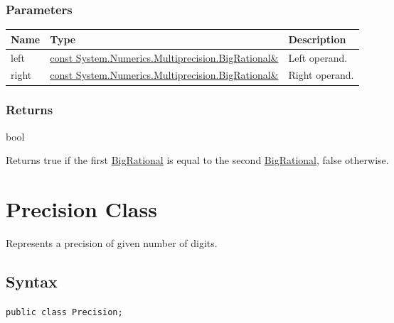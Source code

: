 \documentclass[a4paper,oneside,11.000000pt]{book}
\begin{document}
\subsubsection*{Parameters}
\begin{flushleft}
\begin{supertabular}[l]{!{\raggedright}p{1.30721cm}!{\raggedright}p{8.55945cm}!{\raggedright}p{3.66839cm}}
\textbf{Name}
& \textbf{Type}
& \textbf{Description}
\\
\hline
left
& \hyperlink{System.Numerics.Multiprecision.BigRational}{const System.\-Numerics.\-Multiprecision.\-BigRational\&\-}
& Left operand.

\\
right
& \hyperlink{System.Numerics.Multiprecision.BigRational}{const System.\-Numerics.\-Multiprecision.\-BigRational\&\-}
& Right operand.

\\
\end{supertabular}

\end{flushleft}
\subsubsection*{Returns}bool
\begin{flushleft}
Returns true if the first \hyperlink{System.Numerics.Multiprecision.BigRational}{BigRational} is equal to the second \hyperlink{System.Numerics.Multiprecision.BigRational}{BigRational}, false otherwise.

\end{flushleft}
\clearpage

\hypertarget{System.Numerics.Multiprecision.Precision}{\section{Precision Class}}
\begin{flushleft}
Represents a precision of given number of digits.

\end{flushleft}
\subsection*{Syntax}\texttt{public class Precision;}
\end{document}
